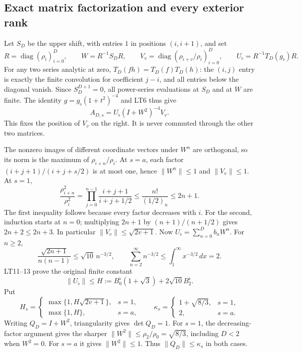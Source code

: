 \subsection{Exact matrix factorization and every exterior rank}

Let $S_D$ be the upper shift, with entries $1$ in positions $(i,i+1)$,
and set
\[
 R=\operatorname{diag}(\rho_i)_{i=0}^D,\qquad
 W=R^{-1}S_DR,\qquad V_v=\operatorname{diag}(\rho_{i+v}/\rho_i)_{i=0}^D,
 \qquad U_\flat=R^{-1}T_D(g_\flat)R .                    \tag{LT12}
\]
For any two series analytic at zero, $T_D(fh)=T_D(f)T_D(h)$:
the $(i,j)$ entry is exactly the finite convolution for coefficient
$j-i$, and all entries below the diagonal vanish. Since $S_D^{D+1}=0$,
all power-series evaluations at $S_D$ and at $W$ are finite.
The identity $g=g_\flat(1+t^2)^{-4}$ and LT6 thus give
\[
 \boxed{A_{D,s}=U_\flat(I+W^2)^{-4}V_v.}                 \tag{LRC7}
\]
This fixes the position of $V_v$ on the right. It is never commuted
through the other two matrices.

The nonzero images of different coordinate vectors under $W^n$ are
orthogonal, so its norm is the maximum of $\rho_{i+n}/\rho_i$.
At $s=a$, each factor $(i+j+1)/(i+j+s/2)$ is at most one, hence
$\|W^n\|\le1$ and $\|V_v\|\le1$. At $s=1$,
\[
 \frac{\rho_{i+n}^2}{\rho_i^2}
 =\prod_{j=0}^{n-1}\frac{i+j+1}{i+j+1/2}
 \le\frac{n!}{(1/2)_n}\le2n+1.                         \tag{LT13}
\]
The first inequality follows because every factor decreases with $i$.
For the second, induction starts at $n=0$; multiplying $2n+1$ by
$(n+1)/(n+1/2)$ gives $2n+2\le2n+3$.
In particular $\|V_v\|\le\sqrt{2v+1}$.
Now $U_\flat=\sum_{n=0}^D b_nW^n$. For $n\ge2$,
\[
 \frac{\sqrt{2n+1}}{n(n-1)}\le\sqrt{10}\,n^{-3/2},\qquad
 \sum_{n=2}^\infty n^{-3/2}
 \le\int_1^\infty x^{-3/2}\,dx=2.
\]
LT11--13 prove the original finite constant
\[
 \|U_\flat\|\le H:=B_0^{\flat}(1+\sqrt3)+2\sqrt{10}B_2^{\flat}.
                                                               \tag{LT14}
\]
Put
\[
 H_s=\begin{cases}\max\{1,H\sqrt{2v+1}\},&s=1,\\
                  \max\{1,H\},&s=a,\end{cases}
 \qquad
 \kappa_s=\begin{cases}1+\sqrt{8/3},&s=1,\\2,&s=a.\end{cases}
                                                               \tag{LT15}
\]
Writing $Q_D=I+W^2$, triangularity gives $\det Q_D=1$.
For $s=1$, the decreasing-factor argument gives the sharper
$\|W^2\|\le\rho_2/\rho_0=\sqrt{8/3}$, including $D<2$ when
$W^2=0$. For $s=a$ it gives $\|W^2\|\le1$.
Thus $\|Q_D\|\le\kappa_s$ in both cases.

